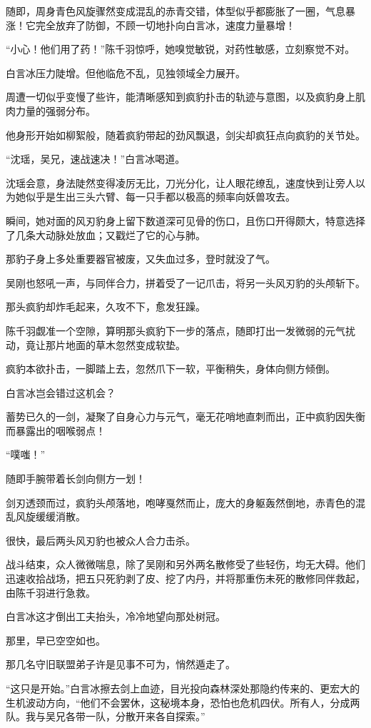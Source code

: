 随即，周身青色风旋骤然变成混乱的赤青交错，体型似乎都膨胀了一圈，气息暴涨！它完全放弃了防御，不顾一切地扑向白言冰，速度力量暴增！

“小心！他们用了药！”陈千羽惊呼，她嗅觉敏锐，对药性敏感，立刻察觉不对。

白言冰压力陡增。但他临危不乱，见独领域全力展开。

周遭一切似乎变慢了些许，能清晰感知到疯豹扑击的轨迹与意图，以及疯豹身上肌肉力量的强弱分布。

他身形开始如柳絮般，随着疯豹带起的劲风飘退，剑尖却疯狂点向疯豹的关节处。

“沈瑶，吴兄，速战速决！”白言冰喝道。

沈瑶会意，身法陡然变得凌厉无比，刀光分化，让人眼花缭乱，速度快到让旁人以为她似乎是生出三头六臂、每一只手都以极高的频率向妖兽攻去。

瞬间，她对面的风刃豹身上留下数道深可见骨的伤口，且伤口开得颇大，特意选择了几条大动脉处放血；又戳烂了它的心与肺。

那豹子身上多处重要器官被废，又失血过多，登时就没了气。

吴刚也怒吼一声，与同伴合力，拼着受了一记爪击，将另一头风刃豹的头颅斩下。

那头疯豹却炸毛起来，久攻不下，愈发狂躁。

陈千羽觑准一个空隙，算明那头疯豹下一步的落点，随即打出一发微弱的元气扰动，竟让那片地面的草木忽然变成软垫。

疯豹本欲扑击，一脚踏上去，忽然爪下一软，平衡稍失，身体向侧方倾倒。

白言冰岂会错过这机会？

蓄势已久的一剑，凝聚了自身心力与元气，毫无花哨地直刺而出，正中疯豹因失衡而暴露出的咽喉弱点！

“噗嗤！”

随即手腕带着长剑向侧方一划！

剑刃透颈而过，疯豹头颅落地，咆哮戛然而止，庞大的身躯轰然倒地，赤青色的混乱风旋缓缓消散。

很快，最后两头风刃豹也被众人合力击杀。

战斗结束，众人微微喘息，除了吴刚和另外两名散修受了些轻伤，均无大碍。他们迅速收拾战场，把五只死豹剥了皮、挖了内丹，并将那重伤未死的散修同伴救起，由陈千羽进行急救。

白言冰这才倒出工夫抬头，冷冷地望向那处树冠。

那里，早已空空如也。

那几名守旧联盟弟子许是见事不可为，悄然遁走了。

“这只是开始。”白言冰擦去剑上血迹，目光投向森林深处那隐约传来的、更宏大的生机波动方向，“他们不会罢休，这秘境本身，恐怕也危机四伏。所有人，分成两队。我与吴兄各带一队，分散开来各自探索。”

